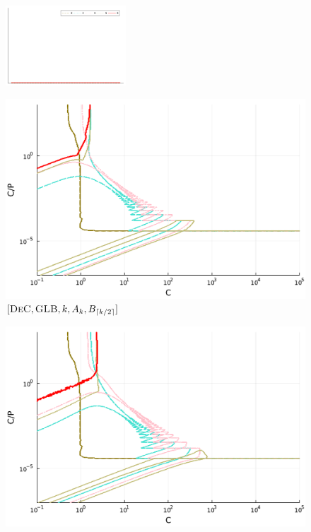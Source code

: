 \begin{figure}
	\centering
	\includegraphics[width=0.4\textwidth,trim={230 340 30 22}, clip]{pdf/pdepics/legends/colors_a-d_new_horiz_2-6_no_order.pdf}\\
	\begin{minipage}[t]{0.32\textwidth}
		\centering
		\includegraphics[width=\textwidth]{pdf/pdepics/disp/IMEXDeC_gaussLobatto_disp_all_2-6_newE.pdf}
		\small$[\textsc{DeC}, \textsc{GLB},k, A_k,B_{\lceil k/2 \rceil}]$\par
	\end{minipage}
	\begin{minipage}[t]{0.32\textwidth}
		\centering
		\includegraphics[width=\textwidth]{pdf/pdepics/disp/IMEXDeC_subtimesteps_gaussLobatto_disp_all_2-6_newE.pdf}

\end{minipage}
\end{figure}
